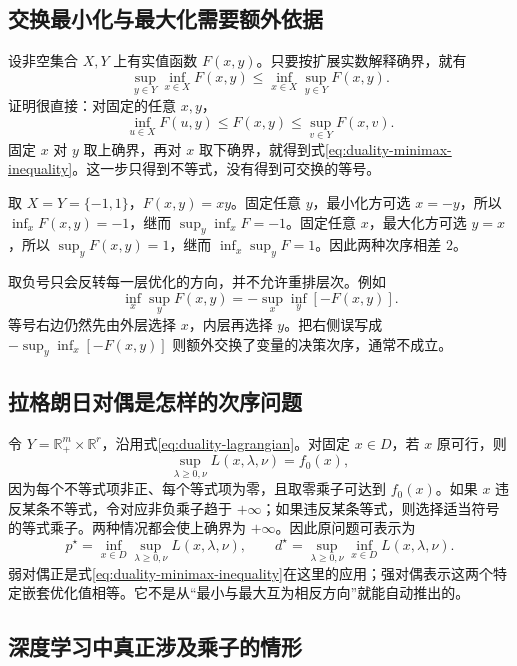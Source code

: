 \documentclass[UTF8]{ctexart}
\begin{document}
\subsection{交换最小化与最大化需要额外依据}

设非空集合 $X,Y$ 上有实值函数 $F(x,y)$。只要按扩展实数解释确界，就有
\begin{equation}
 \sup_{y\in Y}\inf_{x\in X}F(x,y)
 \leq
 \inf_{x\in X}\sup_{y\in Y}F(x,y).
 \label{eq:duality-minimax-inequality}
\end{equation}
证明很直接：对固定的任意 $x,y$，
\[
 \inf_{u\in X}F(u,y)\leq F(x,y)\leq\sup_{v\in Y}F(x,v).
\]
固定 $x$ 对 $y$ 取上确界，再对 $x$ 取下确界，就得到式\eqref{eq:duality-minimax-inequality}。这一步只得到不等式，没有得到可交换的等号。

\begin{example}
取 $X=Y=\{-1,1\}$，$F(x,y)=xy$。固定任意 $y$，最小化方可选 $x=-y$，所以 $\inf_xF(x,y)=-1$，继而 $\sup_y\inf_xF=-1$。固定任意 $x$，最大化方可选 $y=x$，所以 $\sup_yF(x,y)=1$，继而 $\inf_x\sup_yF=1$。因此两种次序相差 $2$。
\end{example}

取负号只会反转每一层优化的方向，并不允许重排层次。例如
\[
 \inf_x\sup_y F(x,y)
 =-\sup_x\inf_y[-F(x,y)].
\]
等号右边仍然先由外层选择 $x$，内层再选择 $y$。把右侧误写成 $-\sup_y\inf_x[-F(x,y)]$ 则额外交换了变量的决策次序，通常不成立。

\subsection{拉格朗日对偶是怎样的次序问题}

令 $Y=\mathbb R_+^m\times\mathbb R^r$，沿用式\eqref{eq:duality-lagrangian}。对固定 $x\in D$，若 $x$ 原可行，则
\[
 \sup_{\lambda\geq0,\nu}L(x,\lambda,\nu)=f_0(x),
\]
因为每个不等式项非正、每个等式项为零，且取零乘子可达到 $f_0(x)$。如果 $x$ 违反某条不等式，令对应非负乘子趋于 $+\infty$；如果违反某条等式，则选择适当符号的等式乘子。两种情况都会使上确界为 $+\infty$。因此原问题可表示为
\begin{equation}
 p^\star=\inf_{x\in D}\sup_{\lambda\geq0,\nu}L(x,\lambda,\nu),
 \qquad
 d^\star=\sup_{\lambda\geq0,\nu}\inf_{x\in D}L(x,\lambda,\nu).
 \label{eq:duality-nested}
\end{equation}
弱对偶正是式\eqref{eq:duality-minimax-inequality}在这里的应用；强对偶表示这两个特定嵌套优化值相等。它不是从“最小与最大互为相反方向”就能自动推出的。

\subsection{深度学习中真正涉及乘子的情形}
\end{document}
